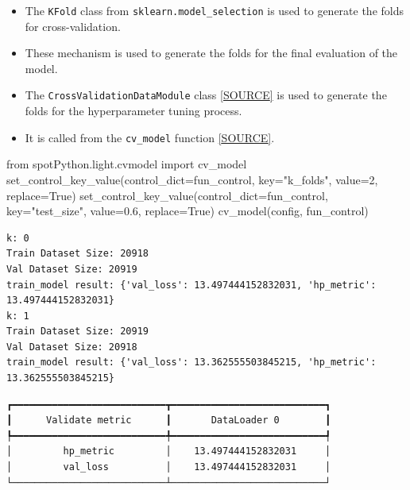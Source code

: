 \documentclass[
  letterpaper,
  DIV=11,
  numbers=noendperiod]{scrreprt}
\newenvironment{Shaded}{\begin{snugshade}}{\end{snugshade}}
\newcommand{\DecValTok}[1]{\textcolor[rgb]{0.68,0.00,0.00}{#1}}
\newcommand{\FloatTok}[1]{\textcolor[rgb]{0.68,0.00,0.00}{#1}}
\newcommand{\ImportTok}[1]{\textcolor[rgb]{0.00,0.46,0.62}{#1}}
\newcommand{\NormalTok}[1]{\textcolor[rgb]{0.00,0.23,0.31}{#1}}
\newcommand{\OperatorTok}[1]{\textcolor[rgb]{0.37,0.37,0.37}{#1}}
\newcommand{\StringTok}[1]{\textcolor[rgb]{0.13,0.47,0.30}{#1}}
\newcommand{\VariableTok}[1]{\textcolor[rgb]{0.07,0.07,0.07}{#1}}
\providecommand{\tightlist}{%
  \setlength{\itemsep}{0pt}\setlength{\parskip}{0pt}}\usepackage{longtable,booktabs,array}
\begin{document}
\begin{itemize}
\tightlist
\item
  The \texttt{KFold} class from \texttt{sklearn.model\_selection} is
  used to generate the folds for cross-validation.
\item
  These mechanism is used to generate the folds for the final evaluation
  of the model.
\item
  The \texttt{CrossValidationDataModule} class
  \href{https://github.com/sequential-parameter-optimization/spotPython/blob/main/src/spotPython/data/lightcrossvalidationdatamodule.py}{{[}SOURCE{]}}
  is used to generate the folds for the hyperparameter tuning process.
\item
  It is called from the \texttt{cv\_model} function
  \href{https://github.com/sequential-parameter-optimization/spotPython/blob/main/src/spotPython/light/cvmodel.py}{{[}SOURCE{]}}.
\end{itemize}

\begin{Shaded}
\begin{Highlighting}[]
\ImportTok{from}\NormalTok{ spotPython.light.cvmodel }\ImportTok{import}\NormalTok{ cv\_model}
\NormalTok{set\_control\_key\_value(control\_dict}\OperatorTok{=}\NormalTok{fun\_control,}
\NormalTok{                        key}\OperatorTok{=}\StringTok{"k\_folds"}\NormalTok{,}
\NormalTok{                        value}\OperatorTok{=}\DecValTok{2}\NormalTok{,}
\NormalTok{                        replace}\OperatorTok{=}\VariableTok{True}\NormalTok{)}
\NormalTok{set\_control\_key\_value(control\_dict}\OperatorTok{=}\NormalTok{fun\_control,}
\NormalTok{                        key}\OperatorTok{=}\StringTok{"test\_size"}\NormalTok{,}
\NormalTok{                        value}\OperatorTok{=}\FloatTok{0.6}\NormalTok{,}
\NormalTok{                        replace}\OperatorTok{=}\VariableTok{True}\NormalTok{)}
\NormalTok{cv\_model(config, fun\_control)}
\end{Highlighting}
\end{Shaded}

\begin{verbatim}
k: 0
Train Dataset Size: 20918
Val Dataset Size: 20919
train_model result: {'val_loss': 13.497444152832031, 'hp_metric': 13.497444152832031}
k: 1
Train Dataset Size: 20919
Val Dataset Size: 20918
train_model result: {'val_loss': 13.362555503845215, 'hp_metric': 13.362555503845215}
\end{verbatim}

\begin{verbatim}
┏━━━━━━━━━━━━━━━━━━━━━━━━━━━┳━━━━━━━━━━━━━━━━━━━━━━━━━━━┓
┃      Validate metric      ┃       DataLoader 0        ┃
┡━━━━━━━━━━━━━━━━━━━━━━━━━━━╇━━━━━━━━━━━━━━━━━━━━━━━━━━━┩
│         hp_metric         │    13.497444152832031     │
│         val_loss          │    13.497444152832031     │
└───────────────────────────┴───────────────────────────┘
\end{verbatim}
\end{document}

